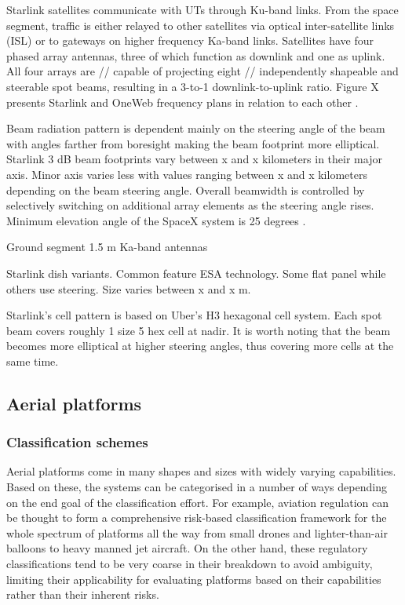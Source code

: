 \documentclass[english, 12pt, a4paper, elec, utf8, a-1b, online]{aaltothesis}
\begin{document}
Starlink satellites communicate with UTs through Ku-band links.
From the space segment, traffic is either relayed to other satellites via optical inter-satellite links (ISL) or to gateways on higher frequency Ka-band links.
Satellites have four phased array antennas, three of which function as downlink and one as uplink.
All four arrays are // capable of projecting eight // independently shapeable and steerable spot beams, resulting in a 3-to-1 downlink-to-uplink ratio.
Figure X presents Starlink and OneWeb frequency plans in relation to each other \cite{spacex2016loa}.

Beam radiation pattern is dependent mainly on the steering angle of the beam with angles farther from boresight making the beam footprint more elliptical.
Starlink 3 dB beam footprints vary between x and x kilometers in their major axis.
Minor axis varies less with values ranging between x and x kilometers depending on the beam steering angle.
Overall beamwidth is controlled by selectively switching on additional array elements as the steering angle rises.
Minimum elevation angle of the SpaceX system is 25 degrees \cite{spacex2016loa, spacex2020mod}.

Ground segment 1.5 m Ka-band antennas

Starlink dish variants. Common feature ESA technology. Some flat panel while others use steering. Size varies between x and x m.

Starlink's cell pattern is based on Uber's H3 hexagonal cell system. Each spot beam covers roughly 1 size 5 hex cell at nadir. It is worth noting that the beam becomes more elliptical at higher steering angles, thus covering more cells at the same time.

\subsection{Aerial platforms} \label{sect-aerial-platforms}

\subsubsection{Classification schemes}

Aerial platforms come in many shapes and sizes with widely varying capabilities.
Based on these, the systems can be categorised in a number of ways depending on the end goal of the classification effort.
For example, aviation regulation can be thought to form a comprehensive risk-based classification framework for the whole spectrum of platforms all the way from small drones and lighter-than-air balloons to heavy manned jet aircraft.
On the other hand, these regulatory classifications tend to be very coarse in their breakdown to avoid ambiguity, limiting their applicability for evaluating platforms based on their capabilities rather than their inherent risks.
\end{document}
